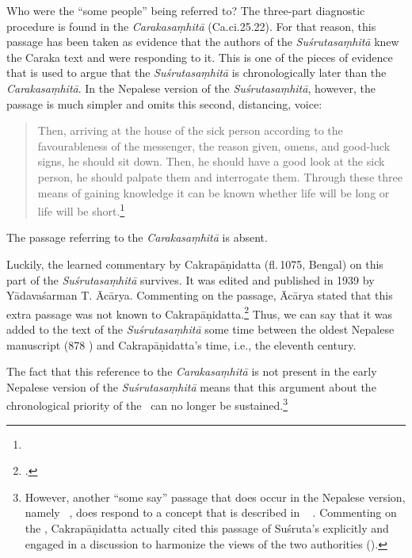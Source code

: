 Who were the “some people” being referred to? The three-part
diagnostic procedure is found in the \emph{Carakasaṃhitā}
(Ca.ci.25.22). For that reason, this passage has been taken as
evidence that the authors of the \emph{Suśrutasaṃhitā} knew the Caraka text
and were responding to it. This is one of the pieces of evidence that
is used to argue that the \emph{Suśrutasaṃhitā} is chronologically
later than the \emph{Carakasaṃhitā}. In the Nepalese version of the
\emph{Suśrutasaṃhitā}, however, the passage is much simpler and omits
this second, distancing, voice:
\begin{quote}
    Then, arriving at the house of the sick person according to the favourableness of 
the messenger, the reason given, omens, and good-luck signs, he should sit down. 
Then, he should have a good look at the sick person, he should palpate them and 
interrogate them. Through these three means of gaining knowledge it can be 
known whether life will be long or life will be short.\footnote{}
\end{quote}
The passage referring to the \emph{Carakasaṃhitā} is absent.

Luckily, the learned commentary by Cakrapāṇidatta (fl.\,1075, Bengal)
on this part of the \emph{Suśrutasaṃhitā} survives. It was edited and
published in 1939 by Yādavaśarman T. Ācārya. Commenting on the
passage, Ācārya stated that this extra passage was not known to
Cakrapāṇidatta.\footnote{.} Thus, we can
    say that it was added to the text of the \emph{Suśrutasaṃhitā} some
    time between the oldest Nepalese manuscript (878 \CE) and
    Cakrapāṇidatta’s time, i.e., the eleventh century.

The fact that this reference to the \emph{Carakasaṃhitā} is not
present in the early Nepalese version of the \emph{Suśrutasaṃhitā}
means that this argument about the chronological priority of the \CS\
can no longer be sustained.\footnote{However, another 
    “some say” passage that does occur in the Nepalese version, namely \SS\
    , does respond to a concept that is described in 
    \CS\ \Ca{6.29.19}{628} \citep[101]{emme-1984}.  Commenting on the
    \CS, Cakrapāṇidatta actually cited this passage of Suśruta's explicitly and 
    engaged in a discussion to harmonize the views of the two authorities 
    (\dev{tena na virodhaścarakasuśrutayoḥ/}).}


